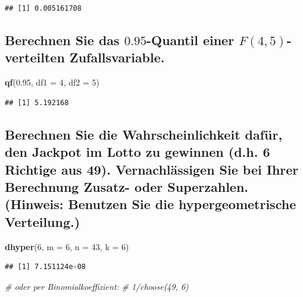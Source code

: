 \documentclass[12pt,a4paper]{article}
\newenvironment{Shaded}{\begin{snugshade}}{\end{snugshade}}
\newcommand{\AttributeTok}[1]{\textcolor[rgb]{0.13,0.29,0.53}{#1}}
\newcommand{\CommentTok}[1]{\textcolor[rgb]{0.56,0.35,0.01}{\textit{#1}}}
\newcommand{\DecValTok}[1]{\textcolor[rgb]{0.00,0.00,0.81}{#1}}
\newcommand{\FloatTok}[1]{\textcolor[rgb]{0.00,0.00,0.81}{#1}}
\newcommand{\FunctionTok}[1]{\textcolor[rgb]{0.13,0.29,0.53}{\textbf{#1}}}
\newcommand{\NormalTok}[1]{#1}
\begin{document}
\begin{verbatim}
## [1] 0.005161708
\end{verbatim}

\subsection{\texorpdfstring{Berechnen Sie das \(0.95\)-Quantil einer
\(F(4, 5)\)-verteilten
Zufallsvariable.}{Berechnen Sie das 0.95-Quantil einer F(4, 5)-verteilten Zufallsvariable.}}\label{berechnen-sie-das-0.95-quantil-einer-f4-5-verteilten-zufallsvariable.}

\begin{Shaded}
\begin{Highlighting}[]
    \FunctionTok{qf}\NormalTok{(}\FloatTok{0.95}\NormalTok{, }\AttributeTok{df1 =} \DecValTok{4}\NormalTok{, }\AttributeTok{df2 =} \DecValTok{5}\NormalTok{)}
\end{Highlighting}
\end{Shaded}

\begin{verbatim}
## [1] 5.192168
\end{verbatim}

\subsection{Berechnen Sie die Wahrscheinlichkeit dafür, den Jackpot im
Lotto zu gewinnen (d.h. 6 Richtige aus 49). Vernachlässigen Sie bei
Ihrer Berechnung Zusatz- oder Superzahlen. (Hinweis: Benutzen Sie die
hypergeometrische
Verteilung.)}\label{berechnen-sie-die-wahrscheinlichkeit-dafuxfcr-den-jackpot-im-lotto-zu-gewinnen-d.h.-6-richtige-aus-49.-vernachluxe4ssigen-sie-bei-ihrer-berechnung-zusatz--oder-superzahlen.-hinweis-benutzen-sie-die-hypergeometrische-verteilung.}

\begin{Shaded}
\begin{Highlighting}[]
    \FunctionTok{dhyper}\NormalTok{(}\DecValTok{6}\NormalTok{, }\AttributeTok{m =} \DecValTok{6}\NormalTok{, }\AttributeTok{n =} \DecValTok{43}\NormalTok{, }\AttributeTok{k =} \DecValTok{6}\NormalTok{)}
\end{Highlighting}
\end{Shaded}

\begin{verbatim}
## [1] 7.151124e-08
\end{verbatim}

\begin{Shaded}
\begin{Highlighting}[]
    \CommentTok{\# oder per Binomialkoeffizient:}
    \CommentTok{\# 1/choose(49, 6)}
\end{Highlighting}
\end{Shaded}
\end{document}

